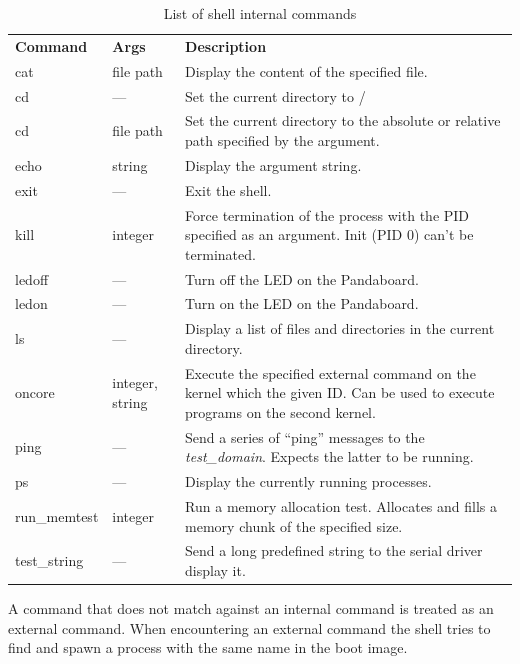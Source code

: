 \documentclass[a4paper,10pt]{article}
\begin{document}
\begin{table}[h]
	\centering
	\begin{tabular}{| m{2.0cm} | m{1.5cm} | m{7.0cm} |}
		\hhline{===}
		\textbf{Command} 	& \textbf{Args} 	& \textbf{Description}	\\
		\hhline{===}
		cat 				& file path 							& Display the content of the specified file.\\ \hline
		cd 				& ---  & Set the current directory to / \\ \hline
		cd 				& file path &  Set the current directory to the absolute or relative path specified by the argument.	\\ \hline
		echo 				& string 							& Display the argument string. \\ \hline
		exit 				& --- 							& Exit the shell. \\ \hline
		kill 				& integer 							& Force termination of the process with the PID specified as an argument. Init (PID 0) can't be terminated. \\ \hline
		ledoff			& ---								& Turn off the LED on the Pandaboard.\\ \hline
		ledon				& --- 							& Turn on the LED on the Pandaboard.\\ \hline
		ls 				& --- 							& Display a list of files and directories in the current directory. \\ \hline
		oncore			& integer, string 					& Execute the specified external command on the kernel which the given ID. Can be used to execute programs on the second kernel.\\ \hline
		ping 				& --- 							& Send a series of ``ping'' messages to the \emph{test\_domain}. Expects the latter to be running.\\ \hline
		ps 				& --- 							& Display the currently running processes.\\ \hline
		run\_memtest		& integer 							& Run a memory allocation test. Allocates and fills a memory chunk of the specified size.\\ \hline
		test\_string		& --- 							& Send a long predefined string to the serial driver display it.\\ \hline            		
	\end{tabular}
	\caption{List of shell internal commands}
	\label{tbl:icl}
\end{table}


A command that does not match against an internal command is treated as an external command.
When encountering an external command the shell tries to find and spawn a process with the same name in the boot image.
\end{document}
